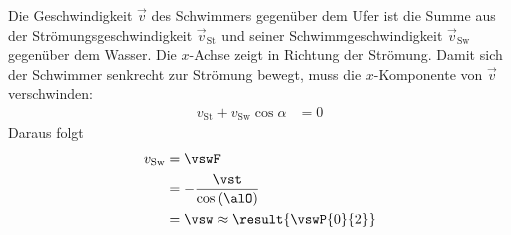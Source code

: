 \begin{center}
\end{center}

Die Geschwindigkeit $\vec v$ des Schwimmers gegenüber dem Ufer ist die Summe aus der Strömungsgeschwindigkeit $\vec v_\text{St}$ und seiner Schwimmgeschwindigkeit $\vec v_\text{Sw}$ gegenüber dem Wasser. Die $x$-Achse zeigt in Richtung der Strömung. Damit sich der Schwimmer senkrecht zur Strömung bewegt, muss die $x$-Komponente von $\vec v$ verschwinden:
\begin{align}
 v_\text{St} + v_\text{Sw}\cos\alpha &= 0
\end{align}
Daraus folgt
\begin{align}
 v_\text{Sw} &= \vswF \\
   &= -\frac{\vst}{\cos\left(\alO\right)} \\
   &= \vsw \approx \result{\vswP{0}{2}}
\end{align}
